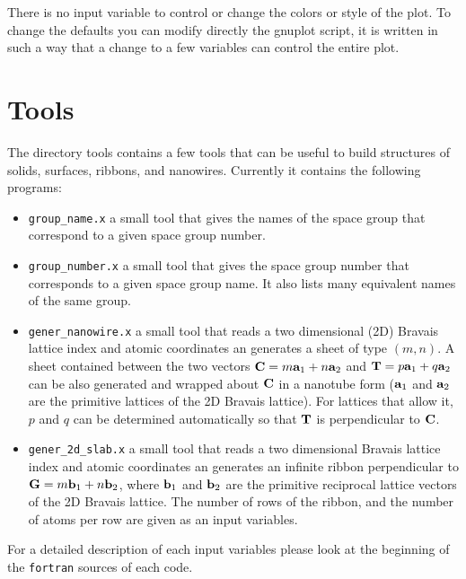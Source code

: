\documentclass[12pt,a4paper]{article}
\begin{document}
There is no input variable to control or change the colors or style of the 
plot. To change the defaults you can modify directly the gnuplot script,
it is written in such a way that a change to a few variables can
control the entire plot.

\section{Tools}

The directory tools contains a few tools that can be useful to build
structures of solids, surfaces, ribbons, and nanowires. Currently it contains
the following programs:

\begin{itemize}

\item \texttt{group\_name.x} a small tool that gives the names of the 
space group that correspond to a given space group number. 

\item \texttt{group\_number.x} a small tool that gives the space group number
that corresponds to a given space group name. It also lists many equivalent
names of the same group.

\item \texttt{gener\_nanowire.x} a small tool that reads a two dimensional (2D)
Bravais lattice index and atomic coordinates an generates a sheet of type
$(m,n)$. A sheet contained between the two vectors 
${\bf C} = m {\bf a}_1 + n {\bf a}_2$ and ${\bf T} = p {\bf a}_1 + q {\bf a}_2$
can be also generated and wrapped about ${\bf C}$ in a nanotube form 
(${\bf a}_1$ and ${\bf a}_2$ are the primitive lattices of the 2D Bravais 
lattice). 
For lattices that allow it, $p$ and $q$ can be determined automatically so that 
${\bf T}$ is perpendicular to ${\bf C}$.

\item \texttt{gener\_2d\_slab.x} a small tool that reads a two dimensional 
Bravais lattice index and atomic coordinates an generates an infinite ribbon
perpendicular to ${\bf G} = m {\bf b}_1 + n {\bf b}_2$, where 
${\bf b}_1$ and ${\bf b}_2$ are the primitive reciprocal lattice vectors 
of the 2D Bravais lattice. The number of rows of the ribbon, and the number of
atoms per row are given as an input variables.

\end{itemize}

For a detailed description of each input variables please look at the beginning 
of the \texttt{fortran} sources of each code.
\end{document}
